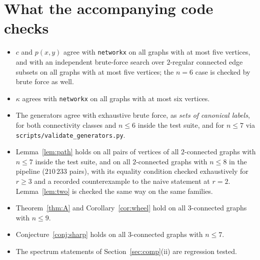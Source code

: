 \documentclass[11pt,a4paper]{article}
\theoremstyle{definition}
\begin{document}
\section{What the accompanying code checks}

\begin{itemize}[leftmargin=*]
\item $c$ and $p(x,y)$ agree with \texttt{networkx} on all graphs with at most
  five vertices, and with an independent brute-force search over $2$-regular
  connected edge subsets on all graphs with at most five vertices; the
  $n=6$ case is checked by brute force as well.
\item $\kappa$ agrees with \texttt{networkx} on all graphs with at most six
  vertices.
\item The generators agree with exhaustive brute force, as \emph{sets of
  canonical labels}, for both connectivity classes and $n\le 6$ inside the test
  suite, and for $n\le 7$ via \texttt{scripts/validate\_generators.py}.
\item Lemma~\ref{lem:path} holds on all pairs of vertices of all
  $2$-connected graphs with $n\le 7$ inside the test suite, and on all
  $2$-connected graphs with $n\le 8$ in the pipeline ($210\,233$ pairs),
  with its equality condition checked exhaustively for $r\ge 3$ and a
  recorded counterexample to the naive statement at $r=2$.
  Lemma~\ref{lem:two} is checked the same way on the same families.
\item Theorem~\ref{thm:A} and Corollary~\ref{cor:wheel} hold on all
  $3$-connected graphs with $n\le 9$.
\item Conjecture~\ref{conj:sharp} holds on all $3$-connected graphs with
  $n\le 7$.
\item The spectrum statements of Section~\ref{sec:comp}(ii) are regression
  tested.
\end{itemize}
\end{document}

